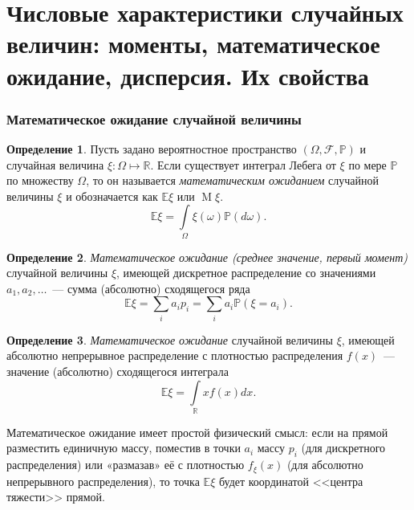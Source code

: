 \documentclass[oneside,final,14pt]{extreport}
\theoremstyle{plain}
\theoremstyle{definition}
\newtheorem*{defn}{Определение}
\theoremstyle{named}
\begin{document}
\section{Числовые характеристики случайных величин: моменты, математическое ожидание, дисперсия. Их свойства}

\subsubsection{Математическое ожидание случайной величины}

\begin{defn}
    Пусть задано вероятностное пространство $(\Omega, \mathcal{F}, \mathbb{P})$ и случайная величина $\xi: \Omega \mapsto \mathbb{R}$. Если существует интеграл Лебега от $\xi$ по мере $\mathbb{P}$ по множеству $\Omega$, то он называется {\it математическим ожиданием} случайной величины $\xi$ и обозначается как $\mathbb{E}\xi$ или $\operatorname{M}\xi$.
    $$ \mathbb{E}\xi = \int\limits_{\Omega} \xi(\omega) \mathbb{P}(d\omega).$$
\end{defn}

\begin{defn}
    {\it Математическое ожидание (среднее значение, первый момент)} случайной величины $\xi$, имеющей дискретное распределение со значениями $a_1, a_2, \ldots$~--- сумма (абсолютно) сходящегося ряда
    \begin{equation*}
        \mathbb{E} \xi=\sum\limits_{i} a_{i} p_{i}=\sum\limits_{i} a_{i} \mathbb{P}\left(\xi=a_{i}\right).
    \end{equation*}
\end{defn}

\begin{defn}
    {\it Математическое ожидание} случайной величины $\xi$, имеющей абсолютно непрерывное распределение с плотностью распределения $f(x)$~--- значение (абсолютно) сходящегося интеграла
    \begin{equation*}
        \mathbb{E} \xi=\int\limits_{\mathbb{R}} x f(x) dx.
    \end{equation*}
\end{defn}

Математическое ожидание имеет простой физический смысл: если на прямой разместить единичную массу, поместив в точки $a_i$ массу $p_i$ (для дискретного распределения) или «размазав» её с плотностью $f_\xi(x)$ (для абсолютно непрерывного распределения), то точка $\mathbb{E}\xi$ будет координатой <<центра тяжести>> прямой.
\end{document}
